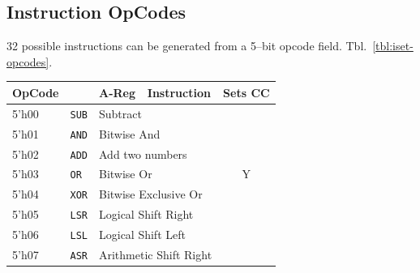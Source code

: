 \documentclass{gqtekspec}
\begin{document}
\subsection{Instruction OpCodes}\label{sec:isa-opcodes}
32 possible instructions can be generated from a 5--bit opcode field.
Tbl.~\ref{tbl:iset-opcodes}.
\begin{table}\begin{center}
\begin{tabular}{|l|l|l|l|c|} \hline \rowcolor[gray]{0.85}
OpCode & & A-Reg & Instruction &Sets CC \\\hline\hline
5'h00 & {\tt SUB} & \multicolumn{2}{l|}{Subtract} &   \\\cline{1-4}
5'h01 & {\tt AND} & \multicolumn{2}{l|}{Bitwise And} &   \\\cline{1-4}
5'h02 & {\tt ADD} & \multicolumn{2}{l|}{Add two numbers} &   \\\cline{1-4}
5'h03 & {\tt OR}  & \multicolumn{2}{l|}{Bitwise Or} & Y \\\cline{1-4}
5'h04 & {\tt XOR} & \multicolumn{2}{l|}{Bitwise Exclusive Or} &   \\\cline{1-4}
5'h05 & {\tt LSR} & \multicolumn{2}{l|}{Logical Shift Right} &   \\\cline{1-4}
5'h06 & {\tt LSL} & \multicolumn{2}{l|}{Logical Shift Left} &   \\\cline{1-4}
5'h07 & {\tt ASR} & \multicolumn{2}{l|}{Arithmetic Shift Right} &   \\\hline


\end{tabular}
\end{center}
\end{table}
\end{document}

